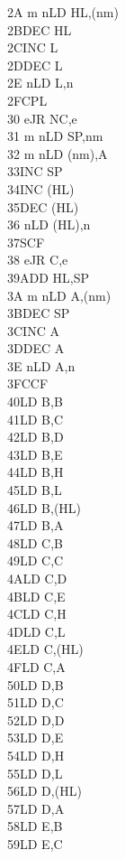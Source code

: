 \documentclass[12pt,twoside,openright,a4paper]{book}
\begin{document}
\begin{multicols}{3}
{\begin{tabbing}
	2A m n\>LD HL,(nm)\\
	2B\>DEC HL\\
	2C\>INC L\\
	2D\>DEC L\\
	2E n\>LD L,n\\
	2F\>CPL\\
	30 e\>JR NC,e\\
	31 m n\>LD SP,nm\\
	32 m n\>LD (nm),A\\
	33\>INC SP\\
	34\>INC (HL)\\
	35\>DEC (HL)\\
	36 n\>LD (HL),n\\
	37\>SCF\\
	38 e\>JR C,e\\
	39\>ADD HL,SP\\
	3A m n\>LD A,(nm)\\
	3B\>DEC SP\\
	3C\>INC A\\
	3D\>DEC A\\
	3E n\>LD A,n\\
	3F\>CCF\\
	40\>LD B,B\\
	41\>LD B,C\\
	42\>LD B,D\\
	43\>LD B,E\\
	44\>LD B,H\\
	45\>LD B,L\\
	46\>LD B,(HL)\\
	47\>LD B,A\\
	48\>LD C,B\\
	49\>LD C,C\\
	4A\>LD C,D\\
	4B\>LD C,E\\
	4C\>LD C,H\\
	4D\>LD C,L\\
	4E\>LD C,(HL)\\
	4F\>LD C,A\\
	50\>LD D,B\\
	51\>LD D,C\\
	52\>LD D,D\\
	53\>LD D,E\\
	54\>LD D,H\\
	55\>LD D,L\\
	56\>LD D,(HL)\\
	57\>LD D,A\\
	58\>LD E,B\\
	59\>LD E,C\\

\end{tabbing}}
\end{multicols}
\end{document}
